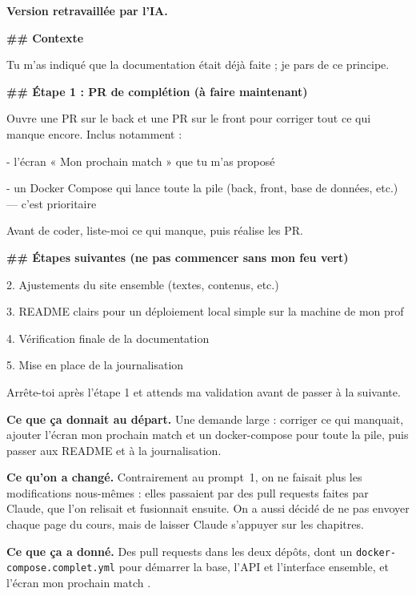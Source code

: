 \documentclass[11pt,a4paper]{article}
\begin{document}
\begin{prompt}
\textbf{Version retravaillée par l'IA.}\par\vspace{0.3em}
\setlength{\parskip}{0.15em}
\textbf{\#\# Contexte}\par
Tu m'as indiqué que la documentation était déjà faite ; je pars de ce principe.\par
\vspace{0.45em}
\textbf{\#\# Étape 1 : PR de complétion (à faire maintenant)}\par
Ouvre une PR sur le back et une PR sur le front pour corriger tout ce qui manque encore. Inclus notamment :\par
- l'écran « Mon prochain match » que tu m'as proposé\par
- un Docker Compose qui lance toute la pile (back, front, base de données, etc.) — c'est prioritaire\par
\vspace{0.45em}
Avant de coder, liste-moi ce qui manque, puis réalise les PR.\par
\vspace{0.45em}
\textbf{\#\# Étapes suivantes (ne pas commencer sans mon feu vert)}\par
2. Ajustements du site ensemble (textes, contenus, etc.)\par
3. README clairs pour un déploiement local simple sur la machine de mon prof\par
4. Vérification finale de la documentation\par
5. Mise en place de la journalisation\par
\vspace{0.45em}
Arrête-toi après l'étape 1 et attends ma validation avant de passer à la suivante.\par
\end{prompt}

\textbf{Ce que ça donnait au départ.} Une demande large : corriger ce qui manquait, ajouter l'écran \og mon prochain match \fg{} et un docker-compose pour toute la pile, puis passer aux README et à la journalisation.

\textbf{Ce qu'on a changé.} Contrairement au prompt~1, on ne faisait plus les modifications nous-mêmes : elles passaient par des pull requests faites par Claude, que l'on relisait et fusionnait ensuite. On a aussi décidé de ne pas envoyer chaque page du cours, mais de laisser Claude s'appuyer sur les chapitres.

\textbf{Ce que ça a donné.} Des pull requests dans les deux dépôts, dont un \texttt{docker-compose.complet.yml} pour démarrer la base, l'API et l'interface ensemble, et l'écran \og mon prochain match \fg{}.
\end{document}
